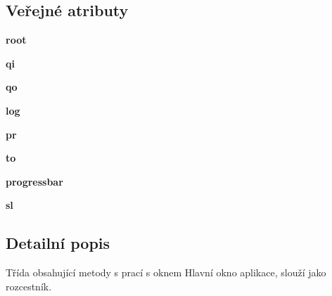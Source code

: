 \subsection*{Veřejné atributy}
\begin{DoxyCompactItemize}
\item 
\hypertarget{classmnWindow_1_1App_a9b8f027f874a31feb1e35ade7cab8d50}{{\bfseries root}}\label{d4/d8e/classmnWindow_1_1App_a9b8f027f874a31feb1e35ade7cab8d50}

\item 
\hypertarget{classmnWindow_1_1App_a67b24743ac9fa2139f09eeee00165afe}{{\bfseries qi}}\label{d4/d8e/classmnWindow_1_1App_a67b24743ac9fa2139f09eeee00165afe}

\item 
\hypertarget{classmnWindow_1_1App_a80bce5f82481df178a78c5658425ee01}{{\bfseries qo}}\label{d4/d8e/classmnWindow_1_1App_a80bce5f82481df178a78c5658425ee01}

\item 
\hypertarget{classmnWindow_1_1App_aa7d02ff198360b8d225a232395a9dfa1}{{\bfseries log}}\label{d4/d8e/classmnWindow_1_1App_aa7d02ff198360b8d225a232395a9dfa1}

\item 
\hypertarget{classmnWindow_1_1App_a360f647c57782bca4c682c2a94dfba61}{{\bfseries pr}}\label{d4/d8e/classmnWindow_1_1App_a360f647c57782bca4c682c2a94dfba61}

\item 
\hypertarget{classmnWindow_1_1App_acd9c0b1e01d55d8f7a70098a383315e8}{{\bfseries to}}\label{d4/d8e/classmnWindow_1_1App_acd9c0b1e01d55d8f7a70098a383315e8}

\item 
\hypertarget{classmnWindow_1_1App_a9749727ad725c621508d5abc185da40c}{{\bfseries progressbar}}\label{d4/d8e/classmnWindow_1_1App_a9749727ad725c621508d5abc185da40c}

\item 
\hypertarget{classmnWindow_1_1App_a9fdba8388fc8ca57e9a47c75a3aafeaa}{{\bfseries sl}}\label{d4/d8e/classmnWindow_1_1App_a9fdba8388fc8ca57e9a47c75a3aafeaa}

\end{DoxyCompactItemize}


\subsection{Detailní popis}
Třída obsahující metody s prací s oknem Hlavní okno aplikace, slouží jako rozcestník. 

